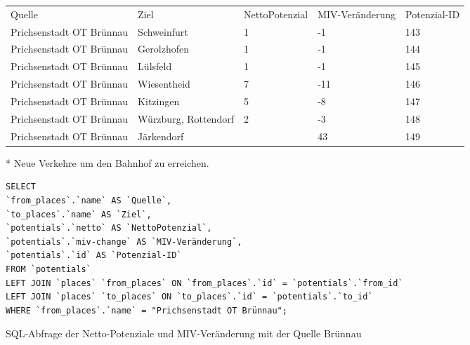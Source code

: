 \begin{tabularx}{\textwidth}{*5{X}}
Quelle & Ziel & NettoPotenzial & MIV-Veränderung & Potenzial-ID\\ 
Prichsenstadt OT Brünnau & Schweinfurt & 1 & -1 & 143\\ 
Prichsenstadt OT Brünnau & Gerolzhofen & 1 & -1 & 144\\ 
Prichsenstadt OT Brünnau & Lülsfeld & 1 & -1 & 145\\ 
Prichsenstadt OT Brünnau & Wiesentheid & 7 & -11 & 146\\ 
Prichsenstadt OT Brünnau & Kitzingen & 5 & -8 & 147\\ 
Prichsenstadt OT Brünnau & Würzburg, Rottendorf & 2 & -3 & 148\\ 
Prichsenstadt OT Brünnau & Järkendorf &  & 43 & 149\\ 
\end{tabularx}
\newline
\newline
* Neue Verkehre um den Bahnhof zu erreichen.
\newline
\begin{listing}[htbp]
\begin{verbatim}
SELECT
`from_places`.`name` AS `Quelle`, 
`to_places`.`name` AS `Ziel`, 
`potentials`.`netto` AS `NettoPotenzial`, 
`potentials`.`miv-change` AS `MIV-Veränderung`, 
`potentials`.`id` AS `Potenzial-ID`
FROM `potentials`
LEFT JOIN `places` `from_places` ON `from_places`.`id` = `potentials`.`from_id`
LEFT JOIN `places` `to_places` ON `to_places`.`id` = `potentials`.`to_id`
WHERE `from_places`.`name` = "Prichsenstadt OT Brünnau";
\end{verbatim}
\caption{SQL-Abfrage der Netto-Potenziale und MIV-Veränderung mit der Quelle Brünnau}\label{lst-fz-bruennau}
\end{listing}